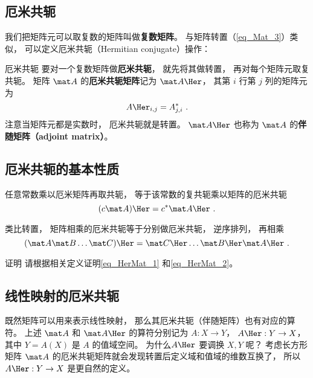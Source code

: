

\subsection{厄米共轭}
我们把矩阵元可以取复数的矩阵叫做\textbf{复数矩阵}。 %
与矩阵转置（\autoref{eq_Mat_3}）类似， 可以定义厄米共轭（Hermitian conjugate）操作：

\begin{definition}{厄米共轭}
要对一个复数矩阵做\textbf{厄米共轭}， 就先将其做转置， 再对每个矩阵元取复共轭。 矩阵 $\mat A$ 的\textbf{厄米共轭矩阵}记为 $\mat A\Her$， 其第 $i$ 行第 $j$ 列的矩阵元为
\begin{equation}
A\Her_{i,j} = A_{j,i}^*~.
\end{equation}
注意当矩阵元都是实数时， 厄米共轭就是转置。 $\mat A\Her$ 也称为 $\mat A$ 的\textbf{伴随矩阵（adjoint matrix）}。
\end{definition}

\subsection{厄米共轭的基本性质}
任意常数乘以厄米矩阵再取共轭， 等于该常数的复共轭乘以矩阵的厄米共轭
\begin{equation}\label{eq_HerMat_1}
(c \mat A)\Her = c^* \mat A\Her~.
\end{equation}

类比转置，%
矩阵相乘的厄米共轭等于分别做厄米共轭， 逆序排列， 再相乘
\begin{equation}\label{eq_HerMat_2}
(\mat A \mat B \dots \mat C)\Her  = \mat C\Her \dots \mat B\Her \mat A\Her~.
\end{equation}

\begin{exercise}{证明}
请根据相关定义证明\autoref{eq_HerMat_1} 和\autoref{eq_HerMat_2}。
\end{exercise}

\subsection{线性映射的厄米共轭}
既然矩阵可以用来表示线性映射， 那么其厄米共轭（伴随矩阵）也有对应的算符。 上述 $\mat A$ 和 $\mat A\Her$ 的算符分别记为 $A:X\to Y$， $A\Her: Y\to X$， 其中 $Y = A(X)$ 是 $A$ 的值域空间。 为什么$A\Her$ 要调换 $X, Y$ 呢？ 考虑长方形矩阵 $\mat A$ 的厄米共轭矩阵就会发现转置后定义域和值域的维数互换了， 所以 $A\Her:Y\to X$ 是更自然的定义。


